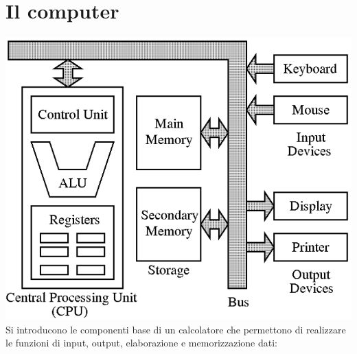 \documentclass[a4paper,12pt, oneside]{book}
\begin{document}
\chapter{Il computer}
\includegraphics[scale=0.5]{img/computer.png}\\
Si introducono le componenti base di un calcolatore che permettono di realizzare le funzioni di input, output, elaborazione e memorizzazione dati:
\end{document}
